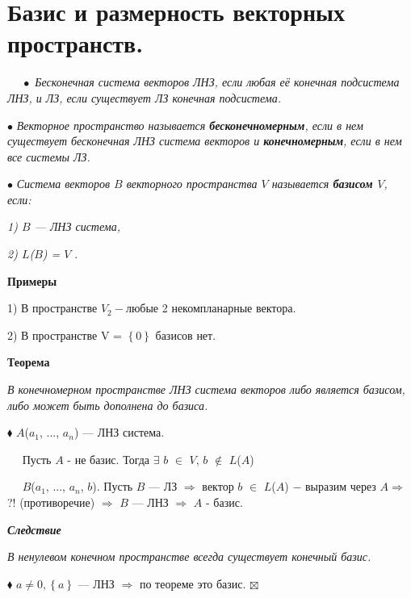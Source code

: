 \documentclass[a4paper, 12pt]{report}
\begin{document}
	
	
	
	
	
	
	
	
	
	\section{Базис и размерность векторных пространств.}
	
	\par\bigskip
	$\quad\; \bullet$ \textit{ Бесконечная система векторов ЛНЗ, если любая её конечная подсистема ЛНЗ, и ЛЗ, если существует ЛЗ конечная подсистема.}
	
	$\bullet$ \textit{Векторное пространство называется \textbf{бесконечномерным}, если в нем существует бесконечная ЛНЗ система векторов и \textbf{конечномерным}, если в нем все системы ЛЗ.}
	
	\par\bigskip
	$\bullet$ \textit{Система векторов $B$ векторного пространства $V$ называется \textbf{базисом $V$}, если:}
	
	\textit{1) $B$ --- ЛНЗ система,}
	
	\textit{2) $L$($B$) = $V$ }.
	\par\bigskip
	\textbf{Примеры}
	
	1) В пространстве $V_2 - $любые 2 некомпланарные вектора.
	
	2) В пространстве V = $\left\{ 0 \right\}$ базисов нет.
	
	\par\bigskip
	\textbf{Теорема}
	
	\textit{В конечномерном пространстве ЛНЗ система векторов либо является базисом, либо может быть дополнена до базиса.}
	
	$\blacklozenge$ $A$($a_1$, ..., $a_n$) --- ЛНЗ система.
	
	$\quad$ Пусть $A$ - не базис. Тогда $\exists$ $b$ $\in$ $V$, $b$ $\notin$ $L$($A$) 
	
	$\quad$ $B$($a_1$, ..., $a_n$, $b$). Пусть $B$ --- ЛЗ $\Rightarrow$ вектор $b$ $\in$ $L$($A$) $-$ выразим через $A \Rightarrow$  ?! (противоречие) $\Rightarrow$ $B$ --- ЛНЗ $\Rightarrow$ $A$ - базис.
	
	\par\bigskip
	\textit{\textbf{Следствие}}
	
	\textit{В ненулевом конечном пространстве всегда существует конечный базис.}
	
	$\blacklozenge$ $a \neq 0, \left\{ a\right\}$ --- ЛНЗ $\Rightarrow$ по теореме это базис. $\boxtimes$
	
\end{document}
